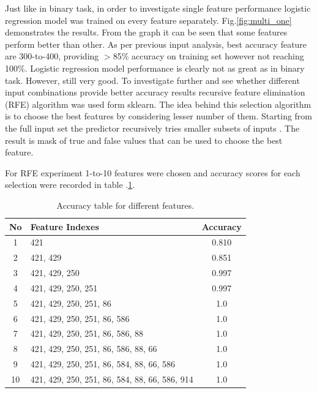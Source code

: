 \documentclass[11pt]{article}
\begin{document}
			Just like in binary task, in order to investigate single feature performance logistic regression model was trained on every feature separately. Fig.\ref{fig:multi_one} demonstrates the results. From the graph it can be seen that some features perform better than other. As per previous input analysis, best accuracy feature are 300-to-400, providing $>$85\% accuracy on training set however not reaching 100\%. Logistic regression model performance is clearly not as great as in binary task. However, still very good. To investigate further and see whether different input combinations provide better accuracy results recursive feature elimination (RFE) algorithm was used form sklearn. The idea behind this selection algorithm is to choose the best features by considering lesser number of them. Starting from the full input set the predictor recursively tries smaller subsets of inputs \cite{rfe}. The result is mask of true and false values that can be used to choose the best feature. 

			For RFE experiment 1-to-10 features were chosen and accuracy scores for each selection were recorded in table .\ref{tbl:accuracy_table}.

		\begin{center}
		  	\begin{table}[h]
		  	\centering
			\begin{tabular}[b]{|c | l | c|}
				 \hline
				 No & Feature Indexes 	  						    & Accuracy \\ 
				 \hline
				 1 & 421 											& 0.810 \\ 
				 2 & 421, 429 										& 0.851 \\ 
				 3 & 421, 429, 250 									& 0.997 \\ 
				 4 & 421, 429, 250, 251 							& 0.997 \\ 
				 5 & 421, 429, 250, 251, 86 						& 1.0 	\\ 
				 6 & 421, 429, 250, 251, 86, 586 					& 1.0 	\\ 
				 7 & 421, 429, 250, 251, 86, 586, 88 				& 1.0 	\\ 
				 8 & 421, 429, 250, 251, 86, 586, 88, 66 			& 1.0 	\\ 
				 9 & 421, 429, 250, 251, 86, 584, 88, 66, 586 		& 1.0 	\\ 
				 10 & 421, 429, 250, 251, 86, 584, 88, 66, 586, 914 & 1.0 	\\ 
				 \hline
			\end{tabular}
			\caption{Accuracy table for different features. }
			\label{tbl:accuracy_table}
			\end{table}
		\end{center}
		\vspace*{-1.3cm}
\end{document}
